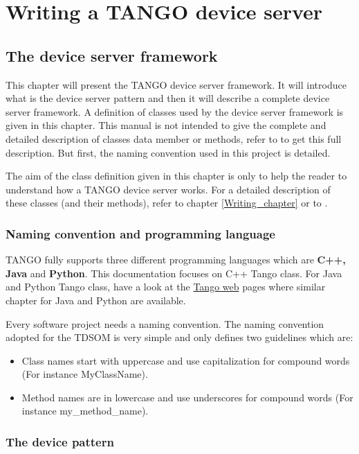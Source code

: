 
\chapter{Writing a TANGO device server}


\section{The device server framework}

This chapter will present the TANGO device server framework. It will
introduce what is the device server pattern and then it will describe
a complete device server framework. A definition of classes used by
the device server framework is given in this chapter. This manual
is not intended to give the complete and detailed description of classes
data member or methods, refer to \cite{TANGO_ref_man} to get this
full description. But first, the naming convention used in this project
is detailed.

The aim of the class definition given in this chapter is only to help
the reader to understand how a TANGO device server works. For a detailed
description of these classes (and their methods), refer to chapter
\ref{Writing_chapter} or to \cite{TANGO_ref_man}.


\subsection{Naming convention and programming language}

TANGO fully supports three different programming languages which are
\textbf{C++, Java} and \textbf{Python}. This documentation focuses
on C++ Tango class. For Java and Python Tango class, have a look at
the \href{http://www.tango-controls.org}{Tango web} pages where similar
chapter for Java and Python are available.

Every software project needs a naming convention. The
naming convention adopted for the TDSOM is very simple and only defines
two guidelines which are:
\begin{itemize}
\item Class names start with uppercase and use capitalization for compound
words (For instance MyClassName).
\item Method names are in lowercase and use underscores for compound words
(For instance my\_method\_name).
\end{itemize}

\subsection{The device pattern}

